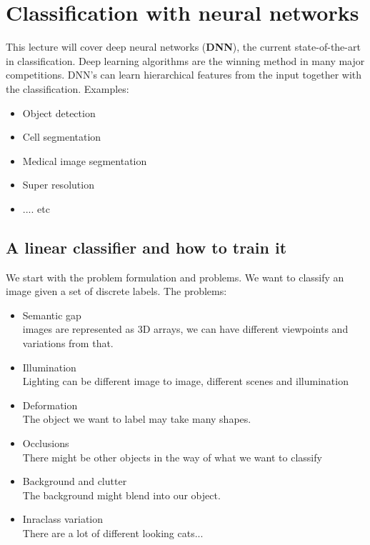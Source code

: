 
\section{Classification with neural networks}
This lecture will cover deep neural networks (\textbf{DNN}), the current state-of-the-art in classification. Deep learning algorithms are the winning method in many major competitions. DNN's can learn hierarchical features from the input together with the classification. Examples:

\begin{itemize}
	\item Object detection
	\item Cell segmentation
	\item Medical image segmentation
	\item Super resolution
	\item .... etc
\end{itemize}

\subsection*{A linear classifier and how to train it}
We start with the problem formulation and problems. We want to classify an image given a set of discrete labels. The problems:

\begin{itemize}
	\item Semantic gap \\
	images are represented as 3D arrays, we can have different viewpoints and variations from that.
	\item Illumination \\
	Lighting can be different image to image, different scenes and illumination
	\item Deformation  \\
	The object we want to label may take many shapes.
	\item Occlusions \\
	There might be other objects in the way of what we want to classify
	\item Background and clutter \\
	The background might blend into our object.
	\item Inraclass variation \\
	There are a lot of different looking cats...
\end{itemize}


